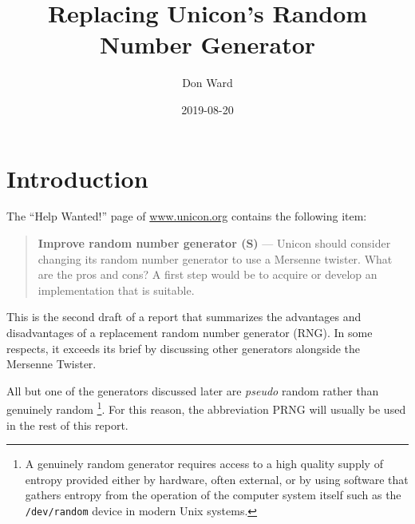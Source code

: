 \documentclass[letterpaper,12pt]{article}
\title{Replacing Unicon's Random\\ Number Generator}
\author{Don Ward}
\date{2019-08-20}
\begin{document}
\maketitle
%
\newcommand{\rndkwd}{{\sf \&random}\ }
\newcommand{\rndlibkwd}{{\sf \&rnglib}\ }
\newcommand{\UniconError}[2]{{\sf#1} --- {\sf #2}}
\newcommand{\surl}[1]{{\small\url{#1}}}
%
\section{Introduction}
The ``{\sf Help Wanted!}'' page of \surl{www.unicon.org}
contains the following item:
\begin{quote}
  {\sf
  {\bf Improve random number generator (S) }
  --- Unicon should consider changing its random number generator to use a
  Mersenne twister. What are the pros and cons?  A first step would be to
  acquire or develop an implementation that is suitable.
  }
\end{quote}
This is the second draft of a report that summarizes the advantages and
disadvantages of a replacement random number generator (RNG).
In some respects, it exceeds its brief by discussing other generators
alongside the Mersenne Twister.

All but one of the generators discussed later are {\em pseudo} random rather
than genuinely random%
\footnote{
  A genuinely random generator requires access to a high quality supply of
  entropy provided either by hardware, often external, or by using software
  that gathers entropy from the operation of the computer system itself
  such as the \texttt{/dev/random} device in modern Unix systems.
}.
For this reason, the abbreviation PRNG will usually be used in the rest of
this report.
\end{document}
